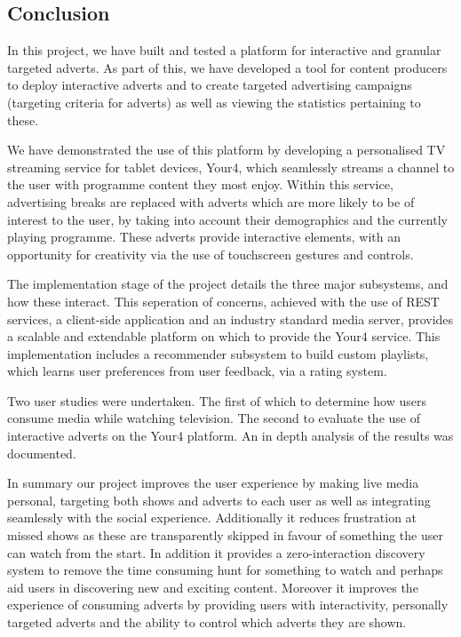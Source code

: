 	\subsubsection{}

\subsection{Conclusion}

In this project, we have built and tested a platform for interactive and granular targeted adverts. As part of this, we have developed a tool for content producers to deploy interactive adverts and to create targeted advertising campaigns (targeting criteria for adverts) as well as viewing the statistics pertaining to these.

We have demonstrated the use of this platform by developing a personalised TV streaming service for tablet devices, Your4, which seamlessly streams a channel to the user with programme content they most enjoy. Within this service, advertising breaks are replaced with adverts which are more likely to be of interest to the user, by taking into account their demographics and the currently playing programme. These adverts provide interactive elements, with an opportunity for creativity via the use of touchscreen gestures and controls.

The implementation stage of the project details the three major subsystems, and how these interact. This seperation of concerns, achieved with the use of REST services, a client-side application and an industry standard media server, provides a scalable and extendable platform on which to provide the Your4 service. This implementation includes a recommender subsystem to build custom playlists, which learns user preferences from user feedback, via a rating system.

Two user studies were undertaken. The first of which to determine how users consume media while watching television. The second to evaluate the use of interactive adverts on the Your4 platform. An in depth analysis of the results was documented.



In summary our project improves the user experience by making live media personal, targeting both shows and adverts to each user as well as integrating seamlessly with the social experience. Additionally it reduces frustration at missed shows as these are transparently skipped in favour of something the user can watch from the start. In addition it provides a zero-interaction discovery system to remove the time consuming hunt for something to watch and perhaps aid users in discovering new and exciting content. Moreover it improves the experience of consuming adverts by providing users with interactivity, personally targeted adverts and the ability to control which adverts they are shown. 
